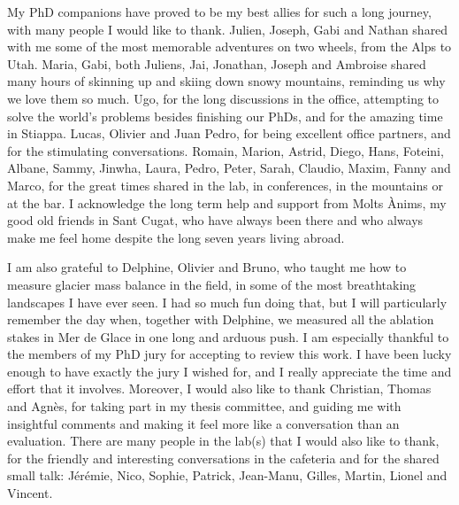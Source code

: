My PhD companions have proved to be my best allies for such a long journey, with many people I would like to thank. Julien, Joseph, Gabi and Nathan shared with me some of the most memorable adventures on two wheels, from the Alps to Utah. Maria, Gabi, both Juliens, Jai, Jonathan, Joseph and Ambroise shared many hours of skinning up and skiing down snowy mountains, reminding us why we love them so much. Ugo, for the long discussions in the office, attempting to solve the world's problems besides finishing our PhDs, and for the amazing time in Stiappa. Lucas, Olivier and Juan Pedro, for being excellent office partners, and for the stimulating conversations. Romain, Marion, Astrid, Diego, Hans, Foteini, Albane, Sammy, Jinwha, Laura, Pedro, Peter, Sarah, Claudio, Maxim, Fanny and Marco, for the great times shared in the lab, in conferences, in the mountains or at the bar. I acknowledge the long term help and support from Molts Ànims, my good old friends in Sant Cugat, who have always been there and who always make me feel home despite the long seven years living abroad. 

I am also grateful to Delphine, Olivier and Bruno, who taught me how to measure glacier mass balance in the field, in some of the most breathtaking landscapes I have ever seen. I had so much fun doing that, but I will particularly remember the day when, together with Delphine, we measured all the ablation stakes in Mer de Glace in one long and arduous push. I am especially thankful to the members of my PhD jury for accepting to review this work. I have been lucky enough to have exactly the jury I wished for, and I really appreciate the time and effort that it involves. Moreover, I would also like to thank Christian, Thomas and Agnès, for taking part in my thesis committee, and guiding me with insightful comments  and making it feel more like a conversation than an evaluation. There are many people in the lab(s) that I would also like to thank, for the friendly and interesting conversations in the cafeteria and for the shared small talk: Jérémie, Nico, Sophie, Patrick, Jean-Manu, Gilles, Martin, Lionel and Vincent. 

